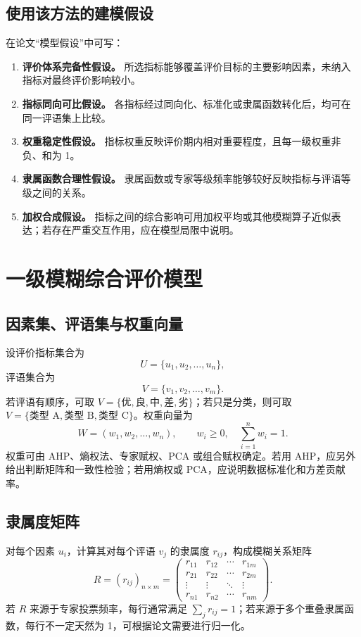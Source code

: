 \documentclass[UTF8,zihao=-4,fontset=none]{ctexart}
\begin{document}
\subsection{使用该方法的建模假设}
在论文“模型假设”中可写：
\begin{enumerate}[label=H\arabic*：,leftmargin=3em]
  \item \textbf{评价体系完备性假设。} 所选指标能够覆盖评价目标的主要影响因素，未纳入指标对最终评价影响较小。
  \item \textbf{指标同向可比假设。} 各指标经过同向化、标准化或隶属函数转化后，均可在同一评语集上比较。
  \item \textbf{权重稳定性假设。} 指标权重反映评价期内相对重要程度，且每一级权重非负、和为 1。
  \item \textbf{隶属函数合理性假设。} 隶属函数或专家等级频率能够较好反映指标与评语等级之间的关系。
  \item \textbf{加权合成假设。} 指标之间的综合影响可用加权平均或其他模糊算子近似表达；若存在严重交互作用，应在模型局限中说明。
\end{enumerate}

\section{一级模糊综合评价模型}
\subsection{因素集、评语集与权重向量}
设评价指标集合为
\begin{equation}
  U=\{u_1,u_2,\ldots,u_n\},
\end{equation}
评语集合为
\begin{equation}
  V=\{v_1,v_2,\ldots,v_m\}.
\end{equation}
若评语有顺序，可取 $V=\{\text{优},\text{良},\text{中},\text{差},\text{劣}\}$；若只是分类，则可取 $V=\{\text{类型 A},\text{类型 B},\text{类型 C}\}$。权重向量为
\begin{equation}
  W=(w_1,w_2,\ldots,w_n),\qquad w_i\ge 0,\quad \sum_{i=1}^n w_i=1.
\end{equation}
权重可由 AHP、熵权法、专家赋权、PCA 或组合赋权确定。若用 AHP，应另外给出判断矩阵和一致性检验；若用熵权或 PCA，应说明数据标准化和方差贡献率。

\subsection{隶属度矩阵}
对每个因素 $u_i$，计算其对每个评语 $v_j$ 的隶属度 $r_{ij}$，构成模糊关系矩阵
\begin{equation}
R=(r_{ij})_{n\times m}=\begin{pmatrix}
r_{11} & r_{12} & \cdots & r_{1m}\\
r_{21} & r_{22} & \cdots & r_{2m}\\
\vdots & \vdots & \ddots & \vdots\\
r_{n1} & r_{n2} & \cdots & r_{nm}
\end{pmatrix}.
\end{equation}
若 $R$ 来源于专家投票频率，每行通常满足 $\sum_j r_{ij}=1$；若来源于多个重叠隶属函数，每行不一定天然为 1，可根据论文需要进行归一化。
\end{document}
